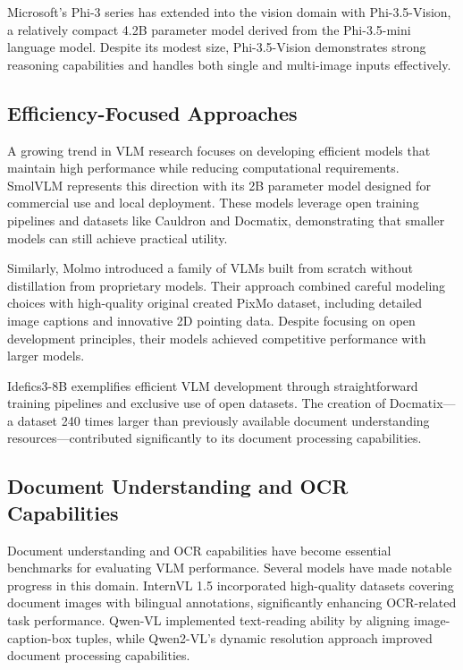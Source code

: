 Microsoft's Phi-3\cite{abdin2024phi3technicalreporthighly} series has extended into the vision domain with Phi-3.5-Vision\cite{abdin2024phi3technicalreporthighly}, a relatively compact 4.2B parameter model derived from the Phi-3.5-mini language model. Despite its modest size, Phi-3.5-Vision demonstrates strong reasoning capabilities and handles both single and multi-image inputs effectively. 

\subsection{Efficiency-Focused Approaches}
A growing trend in VLM research focuses on developing efficient models that maintain high performance while reducing computational requirements. SmolVLM\cite{smolvlm} represents this direction with its 2B parameter model designed for commercial use and local deployment. These models leverage open training pipelines and datasets like Cauldron and Docmatix, demonstrating that smaller models can still achieve practical utility. 

Similarly, Molmo\cite{deitke2024molmopixmoopenweights} introduced a family of VLMs built from scratch without distillation from proprietary models. Their approach combined careful modeling choices with high-quality original created PixMo dataset, including detailed image captions and innovative 2D pointing data. Despite focusing on open development principles, their models achieved competitive performance with larger models. 

Idefics3-8B\cite{laurençon2024buildingbetterunderstandingvisionlanguage} exemplifies efficient VLM development through straightforward training pipelines and exclusive use of open datasets. The creation of Docmatix—a dataset 240 times larger than previously available document understanding resources—contributed significantly to its document processing capabilities. 

\subsection{Document Understanding and OCR Capabilities }
Document understanding and OCR capabilities have become essential benchmarks for evaluating VLM performance. Several models have made notable progress in this domain. InternVL 1.5\cite{chen2024fargpt4vclosinggapInternvl1.5} incorporated high-quality datasets covering document images with bilingual annotations, significantly enhancing OCR-related task performance. Qwen-VL\cite{bai2023qwenvlversatilevisionlanguagemodel} implemented text-reading ability by aligning image-caption-box tuples, while Qwen2-VL's dynamic resolution approach improved document processing capabilities. 


